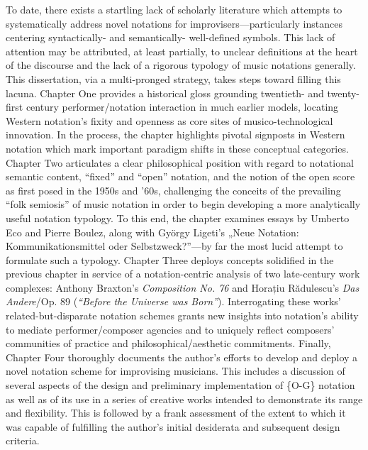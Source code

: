 {
To date, there exists a startling lack of scholarly literature which attempts to systematically address novel notations for improvisers---particularly instances centering syntactically- and semantically- well-defined symbols.
This lack of attention may be attributed, at least partially, to unclear definitions at the heart of the discourse and the lack of a rigorous typology of music notations generally.
This dissertation, via a multi-pronged strategy, takes steps toward filling this lacuna.
Chapter One provides a historical gloss grounding twentieth- and twenty-first century performer/notation interaction in much earlier models, locating Western notation's fixity and openness as core sites of musico-technological innovation.
In the process, the chapter highlights pivotal signposts in Western notation which mark important paradigm shifts in these conceptual categories.
Chapter Two articulates a clear philosophical position with regard to notational semantic content, ``fixed'' and ``open'' notation, and the notion of the open score as first posed in the 1950s and '60s, challenging the conceits of the prevailing ``folk semiosis'' of music notation in order to begin developing a more analytically useful notation typology.
To this end, the chapter examines essays by Umberto Eco and Pierre Boulez, along with Gy\"{o}rgy Ligeti's „Neue Notation: Kommunikationsmittel oder Selbstzweck?”---by far the most lucid attempt to formulate such a typology.
Chapter Three deploys concepts solidified in the previous chapter in service of a notation-centric analysis of two late-century work complexes: Anthony Braxton's \textit{Composition No. 76} and Horațiu Rădulescu's \textit{Das Andere}/Op. 89 (\textit{``Before the Universe was Born''}).
Interrogating these works' related-but-disparate notation schemes grants new insights into notation's ability to mediate performer/composer agencies and to uniquely reflect composers' communities of practice and philosophical/aesthetic commitments.
Finally, Chapter Four thoroughly documents the author's efforts to develop and deploy a novel notation scheme for improvising musicians.
This includes a discussion of several aspects of the design and preliminary implementation of \{O-G\} notation as well as of its use in a series of creative works intended to demonstrate its range and flexibility.
This is followed by a frank assessment of the extent to which it was capable of fulfilling the author's initial desiderata and subsequent design criteria.
}


